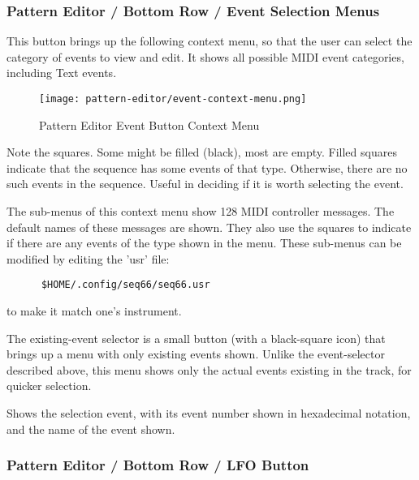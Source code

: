 \subsubsection{Pattern Editor / Bottom Row / Event Selection Menus}
\label{subsubsec:pattern_editor_bottom_event_selection_menus}

   \setcounter{ItemCounter}{0}      %

   This button brings up the following context menu, so that the user can
   select the category of events to view and edit.
   It shows all possible MIDI event categories, including Text events.

\begin{figure}[H]
   \centering 
   \texttt{[image: pattern-editor/event-context-menu.png]}
   \caption{Pattern Editor Event Button Context Menu}
   \label{fig:pattern_editor_bottom_event_context_menu}
\end{figure}

   Note the squares.  Some might be filled (black), most are empty.
   Filled squares indicate that the sequence has some events of that type.
   Otherwise, there are no such events in the sequence.
   Useful in deciding if it is worth selecting the event.

   The sub-menus of this context menu show 128 MIDI controller messages.
   The default names of these messages are shown.
   They also use the squares to
   indicate if there are any events of the type shown in the menu.
   These sub-menus can be modified by editing the 'usr' file:
   
   \begin{verbatim}
      $HOME/.config/seq66/seq66.usr
   \end{verbatim}

   to make it match one's instrument.

   The existing-event selector is a small button (with a black-square icon)
   that brings up a menu with only existing events shown.
   Unlike the event-selector described above, this menu
   shows only the actual events existing in the track, for quicker selection.

   Shows the selection event, with its event number shown in hexadecimal
   notation, and the name of the event shown.

\subsubsection{Pattern Editor / Bottom Row / LFO Button}
\label{subsubsec:pattern_editor_bottom_lfo_button}

